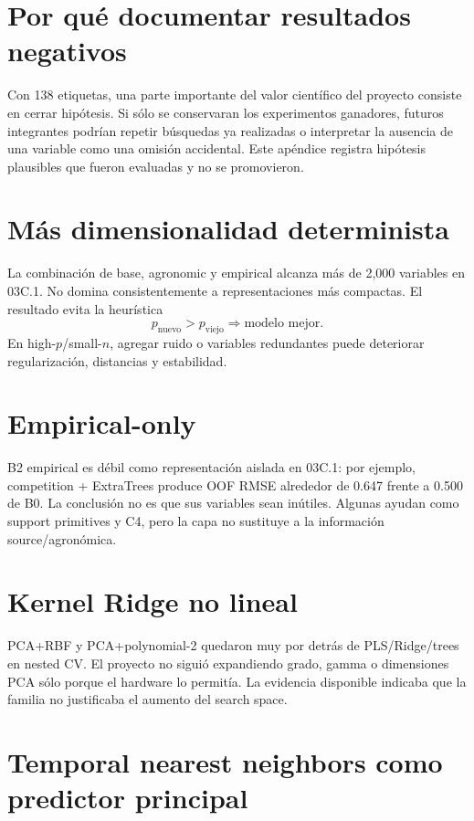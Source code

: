\section{Por qué documentar resultados negativos}

Con 138 etiquetas, una parte importante del valor científico del proyecto consiste en cerrar
hipótesis. Si sólo se conservaran los experimentos ganadores, futuros integrantes podrían
repetir búsquedas ya realizadas o interpretar la ausencia de una variable como una omisión
accidental. Este apéndice registra hipótesis plausibles que fueron evaluadas y no se
promovieron.

\section{Más dimensionalidad determinista}

La combinación de base, agronomic y empirical alcanza más de 2,000 variables en 03C.1. No
domina consistentemente a representaciones más compactas. El resultado evita la heurística
\[
p_{\mathrm{nuevo}}>p_{\mathrm{viejo}}
\Longrightarrow
\text{modelo mejor}.
\]
En high-$p$/small-$n$, agregar ruido o variables redundantes puede deteriorar regularización,
distancias y estabilidad.

\section{Empirical-only}

B2 empirical es débil como representación aislada en 03C.1: por ejemplo, competition +
ExtraTrees produce OOF RMSE alrededor de 0.647 frente a 0.500 de B0. La conclusión no es que
sus variables sean inútiles. Algunas ayudan como support primitives y C4, pero la capa no
sustituye a la información source/agronómica.

\section{Kernel Ridge no lineal}

PCA+RBF y PCA+polynomial-2 quedaron muy por detrás de PLS/Ridge/trees en nested CV. El
proyecto no siguió expandiendo grado, gamma o dimensiones PCA sólo porque el hardware lo
permitía. La evidencia disponible indicaba que la familia no justificaba el aumento del
search space.

\section{Temporal nearest neighbors como predictor principal}

